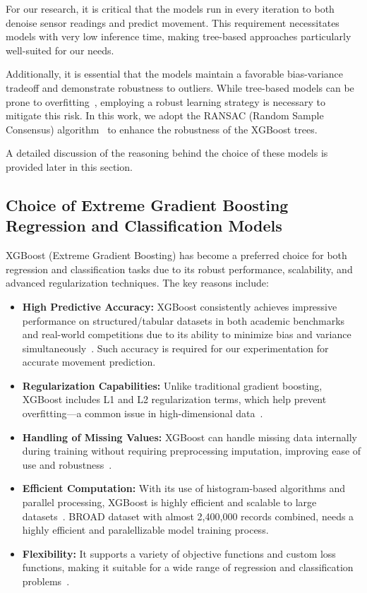 \documentclass{iutbscthesis}
\begin{document}
For our research, it is critical that the models run in every iteration to both denoise sensor readings and predict movement. This requirement necessitates models with very low inference time, making tree-based approaches particularly well-suited for our needs.  

Additionally, it is essential that the models maintain a favorable bias-variance tradeoff and demonstrate robustness to outliers. While tree-based models can be prone to overfitting~\cite{overfitTrees}, employing a robust learning strategy is necessary to mitigate this risk. In this work, we adopt the RANSAC (Random Sample Consensus) algorithm~\cite{fischler1981random} to enhance the robustness of the XGBoost trees. 

A detailed discussion of the reasoning behind the choice of these models is provided later in this section.


\subsection{Choice of Extreme Gradient Boosting Regression and Classification Models}\label{subsec:choice_of_model}
XGBoost (Extreme Gradient Boosting) has become a preferred choice for both regression and classification tasks due to its robust performance, scalability, and advanced regularization techniques. The key reasons include:

\begin{itemize}
    \item \textbf{High Predictive Accuracy:} XGBoost consistently achieves impressive performance on structured/tabular datasets in both academic benchmarks and real-world competitions due to its ability to minimize bias and variance simultaneously~\cite{chen2016xgboost}. Such accuracy is required for our experimentation for accurate movement prediction.
    
    \item \textbf{Regularization Capabilities:} Unlike traditional gradient boosting, XGBoost includes L1 and L2 regularization terms, which help prevent overfitting—a common issue in high-dimensional data~\cite{chen2016xgboost}.
    
    \item \textbf{Handling of Missing Values:} XGBoost can handle missing data internally during training without requiring preprocessing imputation, improving ease of use and robustness~\cite{chen2016xgboost}.
    
    \item \textbf{Efficient Computation:} With its use of histogram-based algorithms and parallel processing, XGBoost is highly efficient and scalable to large datasets~\cite{ke2017lightgbm}. BROAD dataset with almost 2,400,000 records combined, needs a highly efficient and paralellizable model training process.
    
    \item \textbf{Flexibility:} It supports a variety of objective functions and custom loss functions, making it suitable for a wide range of regression and classification problems~\cite{chen2016xgboost}.
\end{itemize}
\end{document}

